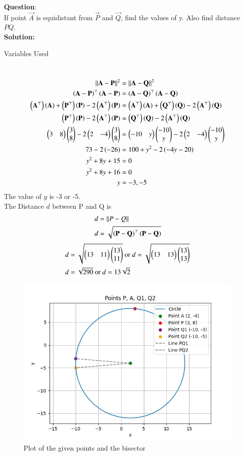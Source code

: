 \documentclass[journal]{IEEEtran}
\begin{document}
\textbf{Question}:\\
If point $\vec{A}$ is equidistant from $\vec{P}$ and $\vec{Q}$, find the values of y. Also find distance $PQ$. 
\\
\textbf{Solution: }
\begin{table}[h!]    
  \centering
  
  \caption{Variables Used}
  \label{tab10.5.3.9.1}
\end{table}\\
\begin{align}
\left\lVert\mathbf{A}-\mathbf{P}\right\rVert^2&=\left\lVert\mathbf{A}-\mathbf{Q}\right\rVert^2\\
	\left(\mathbf{A}-\mathbf{P}\right)^\top\left(\mathbf{A}-\mathbf{P}\right)&=\left(\mathbf{A}-\mathbf{Q}\right)^\top\left(\mathbf{A}-\mathbf{Q}\right)\\
	\left(\mathbf{A}^\top\right)\left(\mathbf{A}\right)+\left(\mathbf{P}^\top\right)\left(\mathbf{P}\right)-2\left(\mathbf{A}^\top\right)\left(\mathbf{P}\right)&=\left(\mathbf{A}^\top\right)\left(\mathbf{A}\right)+\left(\mathbf{Q}^\top\right)\left(\mathbf{Q}\right)-2\left(\mathbf{A}^\top\right)\left(\mathbf{Q}\right)\\
	\left(\mathbf{P}^\top\right)\left(\mathbf{P}\right)-2\left(\mathbf{A}^\top\right)\left(\mathbf{P}\right)&=\left(\mathbf{Q}^\top\right)\left(\mathbf{Q}\right)-2\left(\mathbf{A}^\top\right)\left(\mathbf{Q}\right)\\
\begin{pmatrix}3&8\end{pmatrix}\begin{pmatrix}3\\8\end{pmatrix}-2\begin{pmatrix}2&-4\end{pmatrix}\begin{pmatrix}3\\8\end{pmatrix}&=\begin{pmatrix}-10&y\end{pmatrix}\begin{pmatrix}-10\\y\end{pmatrix}-2\begin{pmatrix}2&-4\end{pmatrix}\begin{pmatrix}-10\\y\end{pmatrix}\\
73-2\left(-26\right)&=100+y^2-2\left(-4y-20\right)\\
y^2+8y+15&=0\\
y^2+8y+16&=0\\
y&=-3,-5
\end{align}
The value of $y$ is -3 or -5.\\
The Distance $d$ between P and Q is 
\begin{align}
	d&=\left\lVert P-Q\right\rVert\\
	d&=\sqrt{\left(\mathbf{P-Q}\right)^\top\left(\mathbf{P-Q}\right)}\\
\end{align}
\begin{align}
d&=\sqrt{\begin{pmatrix}13&11\end{pmatrix}\begin{pmatrix}13\\11\end{pmatrix}}\text{ or }d=\sqrt{\begin{pmatrix}13&13\end{pmatrix}\begin{pmatrix}13\\13\end{pmatrix}}\\
	d&=\sqrt{290}\text{ or }d=13\sqrt{2}
\end{align}

\begin{figure}[h!]
   \centering
   \includegraphics[width=0.7\linewidth]{figs/fig.png}
   \caption{Plot of the given points and the bisector}
   \label{stemplot}
\end{figure}  
\end{document}
